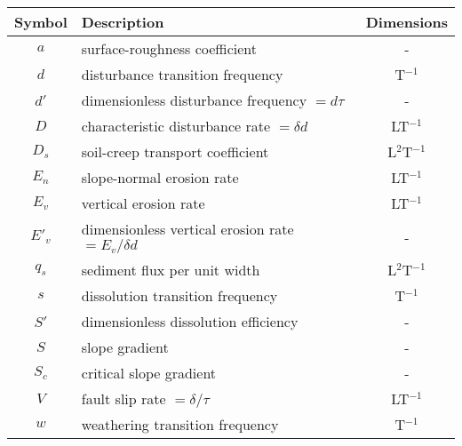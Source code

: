 \documentclass[11pt, oneside]{article}   	%
\begin{document}

\pagestyle{empty}  %
\renewcommand{\thetable}{S\arabic{table}} %

\begin{table}[htbp]
   \centering
   \begin{tabular}{clc} %
      \toprule
      Symbol    & Description & Dimensions \\
      \midrule
      $a$ & surface-roughness coefficient & - \\
      $d$ & disturbance transition frequency & T$^{-1}$ \\
      $d'$ & dimensionless disturbance frequency $=d\tau$ & - \\
      $D$ & characteristic disturbance rate $=\delta d$ & LT$^{-1}$ \\
      $D_s$ & soil-creep transport coefficient & L$^2$T$^{-1}$ \\
      $E_n$ & slope-normal erosion rate & LT$^{-1}$ \\
      $E_v$ & vertical erosion rate & LT$^{-1}$ \\
      $E'_v$ & dimensionless vertical erosion rate $=E_v/\delta d$ & - \\
      $q_s$ & sediment flux per unit width & L$^2$T$^{-1}$ \\
      $s$ & dissolution transition frequency & T$^{-1}$ \\
      $S'$ & dimensionless dissolution efficiency & - \\
      $S$ & slope gradient & - \\
      $S_c$ & critical slope gradient & - \\
      $V$ & fault slip rate $=\delta / \tau$ & LT$^{-1}$ \\
      $w$ & weathering transition frequency & T$^{-1}$ \\

\end{tabular}
\end{table}
\end{document}
